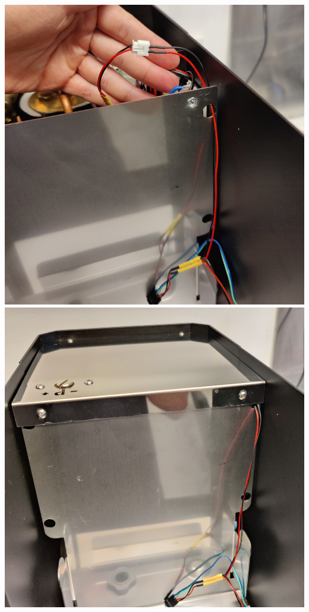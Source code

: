 \documentclass[]{article}
\begin{document}
\begin{minipage}[t]{0.4\linewidth}
	\vspace{0pt}
	\includegraphics[width=\linewidth]{images/03_installation/16_connect_wiretree_psu.jpg}
	\includegraphics[width=\linewidth]{images/03_installation/17_close_top.jpg}
\end{minipage}
\end{document}
